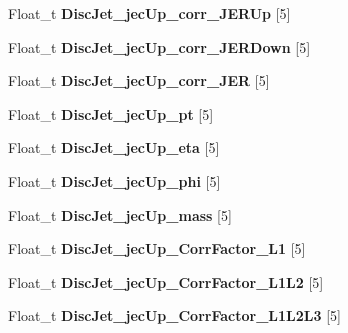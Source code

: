\begin{DoxyCompactItemize}
\hypertarget{classMiniTree_acbb1d5e748ec7cf095cb650e0c1f1c62}{}\label{classMiniTree_acbb1d5e748ec7cf095cb650e0c1f1c62} 
Float\+\_\+t {\bfseries Disc\+Jet\+\_\+jec\+Up\+\_\+corr\+\_\+\+J\+E\+R\+Up} \mbox{[}5\mbox{]}
\item 
\hypertarget{classMiniTree_a38855e9df3e51b6c6195272ae3e2d544}{}\label{classMiniTree_a38855e9df3e51b6c6195272ae3e2d544} 
Float\+\_\+t {\bfseries Disc\+Jet\+\_\+jec\+Up\+\_\+corr\+\_\+\+J\+E\+R\+Down} \mbox{[}5\mbox{]}
\item 
\hypertarget{classMiniTree_a1dff104068fb955fd960144074220b20}{}\label{classMiniTree_a1dff104068fb955fd960144074220b20} 
Float\+\_\+t {\bfseries Disc\+Jet\+\_\+jec\+Up\+\_\+corr\+\_\+\+J\+ER} \mbox{[}5\mbox{]}
\item 
\hypertarget{classMiniTree_a4d3731bbd85b561fc2384ab73a69cb93}{}\label{classMiniTree_a4d3731bbd85b561fc2384ab73a69cb93} 
Float\+\_\+t {\bfseries Disc\+Jet\+\_\+jec\+Up\+\_\+pt} \mbox{[}5\mbox{]}
\item 
\hypertarget{classMiniTree_af7b483e42141e786d029500587548e89}{}\label{classMiniTree_af7b483e42141e786d029500587548e89} 
Float\+\_\+t {\bfseries Disc\+Jet\+\_\+jec\+Up\+\_\+eta} \mbox{[}5\mbox{]}
\item 
\hypertarget{classMiniTree_a898281c521ada49fa3ce8e019c084888}{}\label{classMiniTree_a898281c521ada49fa3ce8e019c084888} 
Float\+\_\+t {\bfseries Disc\+Jet\+\_\+jec\+Up\+\_\+phi} \mbox{[}5\mbox{]}
\item 
\hypertarget{classMiniTree_ae8ca126985f7fa5cbd3ac11f04e72935}{}\label{classMiniTree_ae8ca126985f7fa5cbd3ac11f04e72935} 
Float\+\_\+t {\bfseries Disc\+Jet\+\_\+jec\+Up\+\_\+mass} \mbox{[}5\mbox{]}
\item 
\hypertarget{classMiniTree_a5cbf19987e578cf63e012084ad5a8693}{}\label{classMiniTree_a5cbf19987e578cf63e012084ad5a8693} 
Float\+\_\+t {\bfseries Disc\+Jet\+\_\+jec\+Up\+\_\+\+Corr\+Factor\+\_\+\+L1} \mbox{[}5\mbox{]}
\item 
\hypertarget{classMiniTree_add485c9b2a7d3df262c259fda9da905e}{}\label{classMiniTree_add485c9b2a7d3df262c259fda9da905e} 
Float\+\_\+t {\bfseries Disc\+Jet\+\_\+jec\+Up\+\_\+\+Corr\+Factor\+\_\+\+L1\+L2} \mbox{[}5\mbox{]}
\item 
\hypertarget{classMiniTree_a299ad867ee566f178d3f520c532f2ced}{}\label{classMiniTree_a299ad867ee566f178d3f520c532f2ced} 
Float\+\_\+t {\bfseries Disc\+Jet\+\_\+jec\+Up\+\_\+\+Corr\+Factor\+\_\+\+L1\+L2\+L3} \mbox{[}5\mbox{]}
\item 
\hypertarget{classMiniTree_a88b6ff31d9c38687e08a64c70634bc04}{}\label{classMiniTree_a88b6ff31d9c38687e08a64c70634bc04} 

\end{DoxyCompactItemize}
